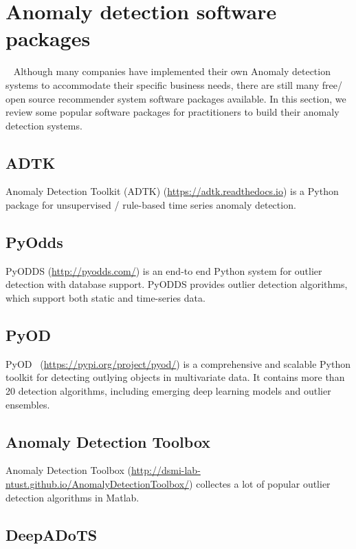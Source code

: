 \section{Anomaly detection software packages}~\label{sec:tools}
Although many companies have implemented their own Anomaly detection systems
to accommodate their specific business needs,
there are still many free/ open source recommender system
software packages available.
In this section,
we review some popular software packages for practitioners
to build their anomaly detection systems.

\subsection{ADTK}

Anomaly Detection Toolkit (ADTK) (\href{https://adtk.readthedocs.io}{https://adtk.readthedocs.io}) is a Python package for
unsupervised / rule-based time series anomaly detection.

\subsection{PyOdds}

PyODDS (\href{http://pyodds.com/}{http://pyodds.com/}) is an end-to end Python system for
outlier detection with database support.
PyODDS provides outlier detection algorithms,
which support both static and time-series data.

\subsection{PyOD}

PyOD~\cite{zhao2019pyod} (\href{https://pypi.org/project/pyod/}{https://pypi.org/project/pyod/})
is a comprehensive and scalable Python toolkit for
detecting outlying objects in multivariate data.
It contains more than 20 detection algorithms,
including emerging deep learning models and
outlier ensembles.

\subsection{Anomaly Detection Toolbox}

Anomaly Detection Toolbox
(\href{http://dsmi-lab-ntust.github.io/AnomalyDetectionToolbox/}{http://dsmi-lab-ntust.github.io/AnomalyDetectionToolbox/})
collectes a lot of popular outlier detection algorithms in Matlab.

\subsection{DeepADoTS}

